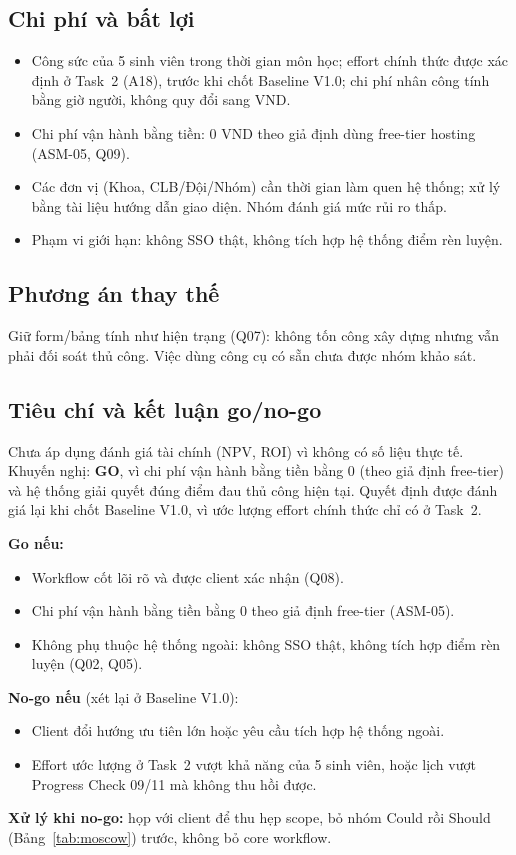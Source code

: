 \subsection*{Chi phí và bất lợi}
\begin{itemize}
  \item Công sức của 5 sinh viên trong thời gian môn học; effort chính thức được xác định ở Task~2 (A18), trước khi chốt Baseline V1.0; chi phí nhân công tính bằng giờ người, không quy đổi sang VND.
  \item Chi phí vận hành bằng tiền: 0 VND theo giả định dùng free-tier hosting (ASM-05, Q09).
  \item Các đơn vị (Khoa, CLB/Đội/Nhóm) cần thời gian làm quen hệ thống; xử lý bằng tài liệu hướng dẫn giao diện. Nhóm đánh giá mức rủi ro thấp.
  \item Phạm vi giới hạn: không SSO thật, không tích hợp hệ thống điểm rèn luyện.
\end{itemize}

\subsection*{Phương án thay thế}
Giữ form/bảng tính như hiện trạng (Q07): không tốn công xây dựng nhưng vẫn phải đối soát thủ công. Việc dùng công cụ có sẵn chưa được nhóm khảo sát.

\subsection*{Tiêu chí và kết luận go/no-go}
Chưa áp dụng đánh giá tài chính (NPV, ROI) vì không có số liệu thực tế. Khuyến nghị: \textbf{GO}, vì chi phí vận hành bằng tiền bằng 0 (theo giả định free-tier) và hệ thống giải quyết đúng điểm đau thủ công hiện tại. Quyết định được đánh giá lại khi chốt Baseline V1.0, vì ước lượng effort chính thức chỉ có ở Task~2.

\textbf{Go nếu:}
\begin{itemize}
  \item Workflow cốt lõi rõ và được client xác nhận (Q08).
  \item Chi phí vận hành bằng tiền bằng 0 theo giả định free-tier (ASM-05).
  \item Không phụ thuộc hệ thống ngoài: không SSO thật, không tích hợp điểm rèn luyện (Q02, Q05).
\end{itemize}

\textbf{No-go nếu} (xét lại ở Baseline V1.0):
\begin{itemize}
  \item Client đổi hướng ưu tiên lớn hoặc yêu cầu tích hợp hệ thống ngoài.
  \item Effort ước lượng ở Task~2 vượt khả năng của 5 sinh viên, hoặc lịch vượt Progress Check 09/11 mà không thu hồi được.
\end{itemize}
\textbf{Xử lý khi no-go:} họp với client để thu hẹp scope, bỏ nhóm Could rồi Should (Bảng~\ref{tab:moscow}) trước, không bỏ core workflow.

